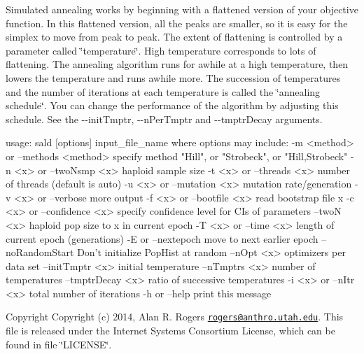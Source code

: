 Simulated annealing works by beginning with a flattened version of your objective function. In this flattened version, all the peaks are smaller, so it is easy for the simplex to move from peak to peak. The extent of flattening is controlled by a parameter called \char`\"{}temperature\char`\"{}. High temperature corresponds to lots of flattening. The annealing algorithm runs for awhile at a high temperature, then lowers the temperature and runs awhile more. The succession of temperatures and the number of iterations at each temperature is called the \char`\"{}annealing schedule\char`\"{}. You can change the performance of the algorithm by adjusting this schedule. See the {\ttfamily -\/-\/init\+Tmptr}, {\ttfamily -\/-\/n\+Per\+Tmptr} and {\ttfamily -\/-\/tmptr\+Decay} arguments. \begin{DoxyVerb}usage: sald [options] input_file_name
   where options may include:
   -m <method> or --methods <method>
      specify method "Hill", or "Strobeck", or "Hill,Strobeck"
   -n <x> or --twoNsmp <x>
      haploid sample size
   -t <x> or --threads <x>
      number of threads (default is auto)
   -u <x> or --mutation <x>
      mutation rate/generation
   -v <x> or --verbose
      more output
   -f <x> or --bootfile <x>
      read bootstrap file x
   -c <x> or --confidence <x>
      specify confidence level for CIs of parameters
   --twoN <x>
      haploid pop size to x in current epoch
   -T <x> or --time <x>
      length of current epoch (generations)
   -E or --nextepoch
      move to next earlier epoch
   --noRandomStart
      Don't initialize PopHist at random
   --nOpt <x>
      optimizers per data set
   --initTmptr <x>
      initial temperature
   --nTmptrs <x>
      number of temperatures
   --tmptrDecay <x>
      ratio of successive temperatures
   -i <x> or --nItr <x>
      total number of iterations
   -h or --help
      print this message
\end{DoxyVerb}


\begin{DoxyCopyright}{Copyright}
Copyright (c) 2014, Alan R. Rogers \href{mailto:rogers@anthro.utah.edu}{\tt rogers@anthro.\+utah.\+edu}. This file is released under the Internet Systems Consortium License, which can be found in file \char`\"{}\+L\+I\+C\+E\+N\+S\+E\char`\"{}. 
\end{DoxyCopyright}
